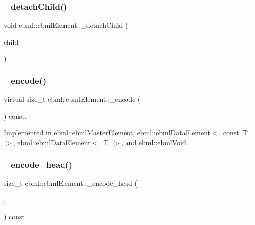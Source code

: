 \subsubsection{\texorpdfstring{\+\_\+detach\+Child()}{\_detachChild()}}
{\footnotesize\ttfamily void ebml\+::ebml\+Element\+::\+\_\+detach\+Child (\begin{DoxyParamCaption}\item[{const \mbox{\hyperlink{namespaceebml_adad533b7705a16bb360fe56380c5e7be}{ebml\+Element\+\_\+sp}} \&}]{child }\end{DoxyParamCaption})\hspace{0.3cm}{\ttfamily [protected]}}

\mbox{\label{classebml_1_1ebmlElement_a27bd9de14e1706840235b68331917776}} 
\subsubsection{\texorpdfstring{\+\_\+encode()}{\_encode()}}
{\footnotesize\ttfamily virtual size\+\_\+t ebml\+::ebml\+Element\+::\+\_\+encode (\begin{DoxyParamCaption}\item[{char $\ast$}]{ }\end{DoxyParamCaption}) const\hspace{0.3cm}{\ttfamily [protected]}, {}}



Implemented in \mbox{\hyperlink{classebml_1_1ebmlMasterElement_aa0dd7215a5de90f8a52364df781952e2}{ebml\+::ebml\+Master\+Element}}, \mbox{\hyperlink{classebml_1_1ebmlDataElement_3_01const_01T_01_4_aac802a573eaeaa5b856d5e74deb9dd3a}{ebml\+::ebml\+Data\+Element$<$ const T $>$}}, \mbox{\hyperlink{classebml_1_1ebmlDataElement_aabb10c15457709e0aa2c1f5744ddbfff}{ebml\+::ebml\+Data\+Element$<$ T $>$}}, and \mbox{\hyperlink{classebml_1_1ebmlVoid_a58183338cb3b41b188cddfbb09a281d5}{ebml\+::ebml\+Void}}.

\mbox{\label{classebml_1_1ebmlElement_a54744a82d2007dac6d8ee795786cc881}} 
\subsubsection{\texorpdfstring{\+\_\+encode\+\_\+head()}{\_encode\_head()}}
{\footnotesize\ttfamily size\+\_\+t ebml\+::ebml\+Element\+::\+\_\+encode\+\_\+head (\begin{DoxyParamCaption}\item[{char $\ast$}]{,  }\item[{size\+\_\+t}]{ }\end{DoxyParamCaption}) const\hspace{0.3cm}{\ttfamily [protected]}}

